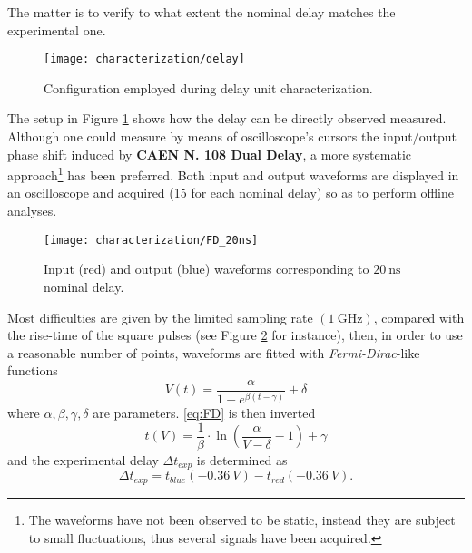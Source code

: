 The matter is to verify to what extent the nominal delay matches the experimental one.  
\begin{figure}[!h]
	\centering
	\texttt{[image: characterization/delay]}
	\caption{Configuration employed during delay unit characterization.}
	\label{fig:delay}
\end{figure}
The setup in Figure \ref{fig:delay} shows how the delay can be directly observed measured. Although one could measure by means of oscilloscope's cursors the input/output phase shift induced by \textbf{CAEN N. 108 Dual Delay}, a more systematic approach\footnote{The waveforms have not been observed to be static, instead they are subject to small fluctuations, thus several signals have been acquired.} has been preferred. Both input and output waveforms are displayed in an oscilloscope and acquired (15 for each nominal delay) so as to perform offline analyses.
\begin{figure}[!h]
	\centering
	\texttt{[image: characterization/FD\_20ns]}
	\caption{Input (red) and output (blue) waveforms corresponding to $\SI{20}{\nano\second}$ nominal delay.}
	\label{fig:wf}
\end{figure}
Most difficulties are given by the limited sampling rate $(\SI{1}{\giga\hertz})$, compared with the rise-time of the square pulses (see Figure \ref{fig:wf} for instance), then, in order to use a reasonable number of points, waveforms are fitted with \emph{Fermi-Dirac}-like functions
\begin{equation} \label{eq:FD}
V(t)=\frac{\alpha}{1+e^{\beta\left(t-\gamma\right)}}+\delta
\end{equation}
where $\alpha,\beta,\gamma,\delta$ are parameters. \eqref{eq:FD} is then inverted
\begin{equation}
t(V) = \frac{1}{\beta}\cdot\ln\left(\displaystyle\frac{\alpha}{V-\delta}-1  \right)+\gamma
\end{equation}
and the experimental delay $\Delta t_{exp}$ is determined as
\begin{equation}
\Delta t_{exp} = t_{blue}(\SI{-0.36}{V})-t_{red}(\SI{-0.36}{V}).
\end{equation}

